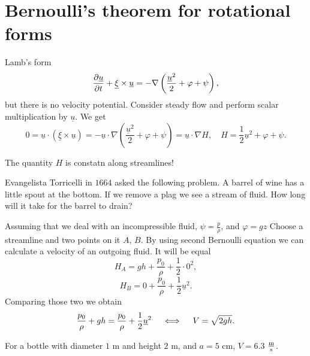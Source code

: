 \documentclass[11pt,oneside]{book}
\renewcommand{\vec}[1]{\underline{#1}}
\theoremstyle{definition} %
\theoremstyle{plain} %
\theoremstyle{remark} %
\theoremstyle{underline}
\begin{document}
  \section{Bernoulli's theorem for rotational forms}
  
  Lamb's form 
  \begin{displaymath}
    \ptf{\vec u}{t} + \vec \xi \times \vec u = - \nabla \left( \frac{\vec u^2}{2} + \varphi + \psi \right),
  \end{displaymath}
  but there is no velocity potential.
  Consider steady flow and perform scalar multiplication by $\vec u$.
  We get 
  \begin{displaymath}
    0 = \vec u \cdot (\vec \xi \times \vec u) 
    = - \vec u \cdot\nabla \left(\frac{\vec u^2}{2} + \varphi + \psi\right)
    = \vec u \cdot \nabla H, \quad H = \frac{1}{2} \vec u^2 + \varphi + \psi.
  \end{displaymath}
  
  The quantity $H$ is constatn along streamlines!

  Evangelista Torricelli in $1664$ asked the following problem.
  A barrel of wine has a little spout at the bottom. 
  If we remove a plag we see a stream of fluid.
  How long will it take for the barrel to drain?

  Assuming that we deal with an incompressible fluid, $\psi = \frac{p}{\rho}$, and $\varphi = g z$
  Choose a streamline and two points on it $A$, $B$.
  By using second Bernoulli equation we can calculate a velocity of an outgoing fluid.
  It will be equal
  \begin{displaymath}
    H_A = gh + \frac{p_0}{\rho} + \frac{1}{2} \cdot 0 ^2 ,
  \end{displaymath}
  \begin{displaymath}
    H_B = 0 + \frac{p_0}{\rho} + \frac{1}{2} \vec u^2.
  \end{displaymath}
  Comparing those two we obtain
  \begin{displaymath}
    \frac{p_0}{\rho} + gh = \frac{p_0}{\rho} + \frac{1}{2} \vec u^2 \qiff V = \sqrt{2gh}.
  \end{displaymath}

  For a bottle with diameter $1$ m and height $2$ m, and $a = 5$ cm, $V = 6.3$ $\frac{\textrm{m}}{\textrm{s}}$.
  
\end{document}
